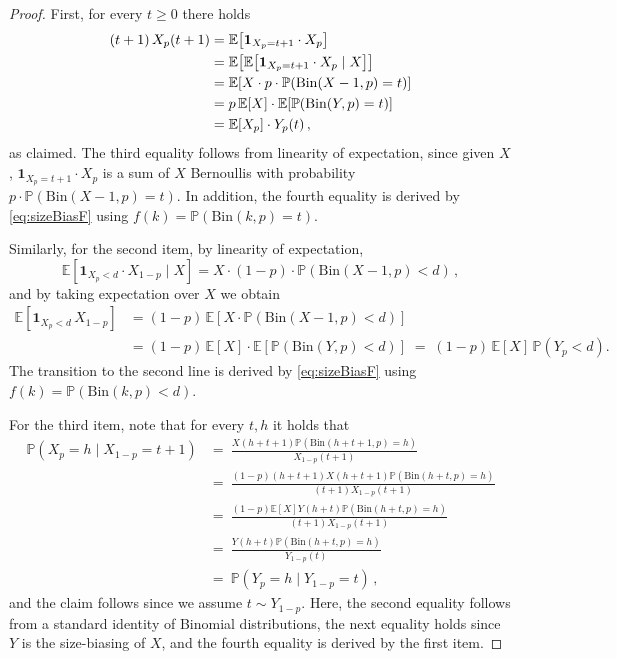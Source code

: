 \documentclass[reqno,english]{amsart}
\numberwithin{equation}{section}
\theoremstyle{definition}{
\newtheorem{example}[theorem]{Example}
\newtheorem{definition}[theorem]{Definition}
\newtheorem*{definition*}{Definition}
\newtheorem{problem}[theorem]{Problem}
\newtheorem{question}[theorem]{Question}
}
\newcommand{\E}{\mathbb E}
\renewcommand{\P}{\mathbb P}
\newcommand{\Bin}{\mathrm{Bin}}
\begin{document}
\begin{proof}
First, for every $t \ge 0$ there holds 
\begin{align}
\label{eq:yp_sizebias_of_xp}
(t+1)\,X_p(t+1)
&= \E\!\left[\mathbf 1_{X_p=t+1}\cdot X_p\right] \notag\\
&= \E\!\left[\E\!\left[\mathbf 1_{X_p=t+1}\cdot X_p \mid X\right]\right] \notag\\
&= \E\!\left[X\cdot p \cdot \P(\Bin(X-1,p)=t )\right] \notag\\
&= p\,\E[X]\cdot \E[\P(\Bin(Y,p)=t)] \notag\\
&= \E[X_p]\cdot Y_p(t)\,, \notag
\end{align}
as claimed. The third equality follows from linearity of expectation, since given $X$, $\mathbf 1_{X_p=t+1}\cdot X_p$ is a sum of $X$ Bernoullis with probability $p\cdot\P(\Bin(X-1,p)=t).$ In addition, the fourth equality is derived by \eqref{eq:sizeBiasF} using $f(k)=\P(\Bin(k,p)=t).$


Similarly, for the second item, by linearity of expectation,
\[
\E[\mathbf 1_{X_p<d}\cdot X_{1-p}\mid X] = X\cdot (1-p)\cdot\P(\Bin(X-1,p)<d)\,,
\]
and by taking expectation over $X$ we obtain
\begin{align*}
\E\!\left[\mathbf 1_{X_p<d}\,X_{1-p}\right]
&=(1-p)\,\E\!\left[X\cdot\P\!\left(\Bin(X-1,p)<d \right)\right] \\
&=(1-p)\,\E[X]\cdot\E[\P\!\left(\Bin(Y,p)<d\right)]
\;=\;(1-p)\,\E[X]\,\P\!\left(Y_p<d\right).
\end{align*}
The transition to the second line is derived by \eqref{eq:sizeBiasF} using $f(k)=\P(\Bin(k,p)<d)$.

For the third item, note that for every $t,h$ it holds that
\begin{align*}
\P(X_p=h\mid X_{1-p}=t+1) &=~ \frac{X(h+t+1)\P(\Bin(h+t+1,p)=h)}{X_{1-p}(t+1)}\\[0.6em]
&=~ \frac{(1-p)(h+t+1)X(h+t+1)\P(\Bin(h+t,p)=h)}{(t+1)X_{1-p}(t+1)} \\[0.6em]
&=~ \frac{(1-p)\E[X]Y(h+t)\P(\Bin(h+t,p)=h)}{(t+1)X_{1-p}(t+1)} \\[0.6em]
&=~ \frac{Y(h+t)\P(\Bin(h+t,p)=h)}{Y_{1-p}(t)} \\
&=~ \P(Y_p=h\mid Y_{1-p}=t) \,,
\end{align*}
and the claim follows since we assume $t\sim Y_{1-p}$. Here, the second equality follows from a standard identity of Binomial distributions, the next equality holds since $Y$ is the size-biasing of $X$, and the fourth equality is derived by the first item.
\end{proof}
\end{document}
